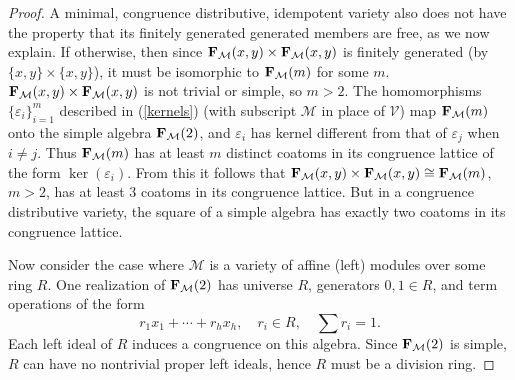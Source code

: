 \begin{proof}
  A minimal, congruence distributive, idempotent
  variety also does not have the property
  that its finitely generated generated members are free,
  as we now explain. If otherwise, then since
  ${{\mathbf{\uppercase{f}}}}_{\mathcal M}(x,y)\times {{\mathbf{\uppercase{f}}}}_{\mathcal M}(x,y)$
  is finitely generated (by $\{x,y\}\times \{x,y\}$), it must be
  isomorphic to ${{\mathbf{\uppercase{F}}}}_{\mathcal M}(m)$ for some $m$.
  ${{\mathbf{\uppercase{f}}}}_{\mathcal M}(x,y)\times {{\mathbf{\uppercase{f}}}}_{\mathcal M}(x,y)$ is not trivial or simple,
  so $m>2$.   The homomorphisms $\{\varepsilon_i\}_{i=1}^m$
    described in (\ref{kernels})
  (with subscript $\mathcal M$ in place of $\mathcal V$)
  map ${{\mathbf{\uppercase{f}}}}_{\mathcal M}(m)$
  onto the simple algebra ${{\mathbf{\uppercase{f}}}}_{\mathcal M}(2)$,
  and $\varepsilon_i$ has kernel
  different from that of $\varepsilon_j$ when $i\neq j$.
  Thus ${{\mathbf{\uppercase{f}}}}_{\mathcal M}(m)$ has at least $m$ distinct coatoms in
  its congruence lattice
  of the form $\ker(\varepsilon_i)$.
  From this it follows that 
  ${{\mathbf{\uppercase{f}}}}_{\mathcal M}(x,y)\times {{\mathbf{\uppercase{f}}}}_{\mathcal M}(x,y)\cong {{\mathbf{\uppercase{f}}}}_{\mathcal M}(m)$,
  $m>2$,
  has at least
  $3$ coatoms in its congruence lattice.
  But in a congruence distributive variety, the square of a simple
  algebra has exactly two coatoms in its congruence lattice.

  Now consider the case where $\mathcal M$ is a
  variety of affine (left) modules over some ring $R$.
  One realization of ${{\mathbf{\uppercase{f}}}}_{\mathcal M}(2)$
  has universe $R$, generators $0, 1\in R$, and term operations
  of the form
  \[
r_1x_1+\cdots + r_hx_h,\quad r_i\in R, \quad \sum r_i = 1.
\]
Each left ideal of $R$ induces a congruence on this algebra.
Since ${{\mathbf{\uppercase{f}}}}_{\mathcal M}(2)$ is simple, $R$ can have no nontrivial
proper left ideals, hence $R$ must be a division ring.


\end{proof}
